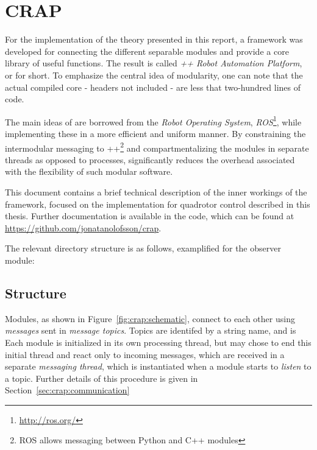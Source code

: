 \chapter{CRAP}
\label{app:crap}
    For the implementation of the theory presented in this report, a
    framework was developed for connecting the different separable modules
    and provide a core library of useful functions.
    The result is called \textit{\C++ Robot Automation Platform}, or \crap for short.
    To emphasize the central idea of modularity, one can note that the actual compiled
    core - headers not included - are less that two-hundred lines of code.

    The main ideas of \crap are borrowed from the \textit{Robot Operating System}, \textit{ROS}\footnote{\url{http://ros.org/}},
    while implementing these in a more efficient and uniform manner.
    By constraining the intermodular messaging to \C++\footnote{ROS allows messaging between Python and C++ modules} and compartmentalizing the
    modules in separate threads as opposed to processes, \crap significantly
    reduces the overhead associated with the flexibility of such modular software.

    This document contains a brief technical description of the inner workings of the framework,
    focused on the implementation for quadrotor control described in this thesis.
    Further documentation is available in the code, which can be found at
    \url{https://github.com/jonatanolofsson/crap}.

    The relevant directory structure is as follows,
    examplified for the observer module:

    \begin{minipage}{\textwidth}
    \end{minipage}

    \section{Structure}
    \label{sec:crap:structure}
        Modules, as shown in Figure~\ref{fig:crap:schematic},
        connect to each other using \textit{messages} sent in \textit{message topics}.
        Topics are identifed by a string name, and is
        Each module is initialized in its own processing thread, but may
        chose to end this initial thread and react only to
        incoming messages, which are received in a separate \textit{messaging thread},
        which is instantiated when a module starts to \textit{listen} to a topic.
        Further details of this procedure is given in Section~\ref{sec:crap:communication}

